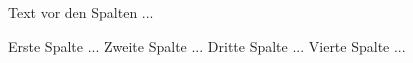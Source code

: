 Text vor den Spalten ...
\begin{cols}[4]
  Erste Spalte ...
  \colbreak
  Zweite Spalte ...
  \colbreak
  Dritte Spalte ...
  \colbreak
  Vierte Spalte ...
\end{cols}
